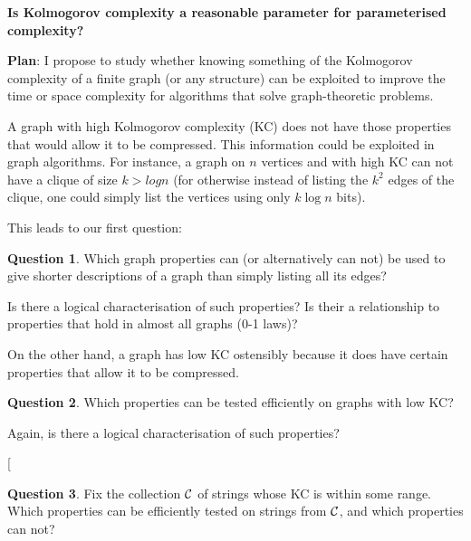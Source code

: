 \documentclass[11pt]{article}
\theoremstyle{plain} \numberwithin{equation}{section}
\theoremstyle{definition}
\newtheorem{question}{Question} \topmargin-2cm
\begin{document}
\thispagestyle{fancy}

\begin{center}
{\bf Is Kolmogorov complexity a reasonable parameter for parameterised complexity?}
\end{center}

\noindent
{\bf Plan}: I propose to study whether knowing something of the Kolmogorov complexity of a finite graph (or any structure) can be exploited to improve the time or space complexity for algorithms that solve graph-theoretic problems.

A graph with high Kolmogorov complexity (KC) does not have those properties that would allow it to be compressed. This information could be exploited in graph algorithms. For instance, a graph on $n$ vertices and with high KC can not have a clique of size $k > log n$ (for otherwise instead of listing the $k^2$ edges of the clique, one could simply list the vertices using only $k \log n$ bits). 

This leads to our first question:
\begin{question}
Which graph properties can (or alternatively can not) be used to give shorter descriptions of a graph than simply listing all its edges?
\end{question}

Is there a logical characterisation of such properties?
Is their a relationship to properties that hold in almost all graphs (0-1 laws)? 

On the other hand, a graph has low KC ostensibly because it does have certain properties that allow it to be compressed.

\begin{question}
Which properties can be tested efficiently on graphs with low KC?
\end{question}

Again, is there a logical characterisation of such properties?

[\begin{question}
Fix the collection ${\mathcal C}$ of strings whose KC is within some range. Which properties can be efficiently tested on strings from ${\mathcal C}$, and which properties can not? 
\end{question}

\end{document}

